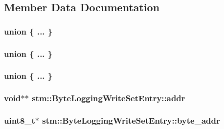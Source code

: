 \subsection{Member Data Documentation}
\hypertarget{structstm_1_1ByteLoggingWriteSetEntry_aac5ab0b89cfc1af63e6321c116c660a8}{\subsubsection[{"@10}]{\setlength{\rightskip}{0pt plus 5cm}union \{ ... \} }}\label{structstm_1_1ByteLoggingWriteSetEntry_aac5ab0b89cfc1af63e6321c116c660a8}
\hypertarget{structstm_1_1ByteLoggingWriteSetEntry_a34ef106524477581d8b32934ee394e19}{\subsubsection[{"@12}]{\setlength{\rightskip}{0pt plus 5cm}union \{ ... \} }}\label{structstm_1_1ByteLoggingWriteSetEntry_a34ef106524477581d8b32934ee394e19}
\hypertarget{structstm_1_1ByteLoggingWriteSetEntry_a94e94030b0d59ccb9e0badd443d0663b}{\subsubsection[{"@14}]{\setlength{\rightskip}{0pt plus 5cm}union \{ ... \} }}\label{structstm_1_1ByteLoggingWriteSetEntry_a94e94030b0d59ccb9e0badd443d0663b}
\hypertarget{structstm_1_1ByteLoggingWriteSetEntry_aa3ecfa56c0fd3095755a31c95ff65fb8}{
\subsubsection[{addr}]{\setlength{\rightskip}{0pt plus 5cm}void$\ast$$\ast$ stm\-::\-Byte\-Logging\-Write\-Set\-Entry\-::addr}}\label{structstm_1_1ByteLoggingWriteSetEntry_aa3ecfa56c0fd3095755a31c95ff65fb8}
\hypertarget{structstm_1_1ByteLoggingWriteSetEntry_a6530d68791fa8f1b587e66f916fe8113}{
\subsubsection[{byte\-\_\-addr}]{\setlength{\rightskip}{0pt plus 5cm}uint8\-\_\-t$\ast$ stm\-::\-Byte\-Logging\-Write\-Set\-Entry\-::byte\-\_\-addr}}\label{structstm_1_1ByteLoggingWriteSetEntry_a6530d68791fa8f1b587e66f916fe8113}
